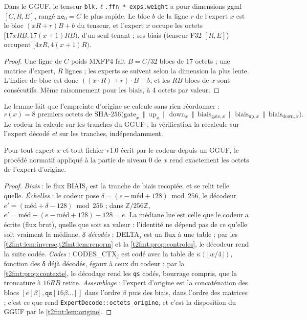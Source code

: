 \begin{lemme}\label{t2fmt:lem:origine}
Dans le GGUF, le tenseur \texttt{blk.$\ell$.ffn\_*\_exps\allowbreak.weight} a pour dimensions ggml $[C, R, E]$, rangé $\texttt{ne}_0 = C$ le plus rapide. Le bloc $b$ de la ligne $r$ de l'expert $x$ est le bloc $(xR + r)B + b$ du tenseur, et l'expert $x$ occupe les octets $[17xRB, 17(x+1)RB)$, d'un seul tenant ; ses biais (tenseur F32 $[R, E]$) occupent $[4xR, 4(x+1)R)$.
\end{lemme}
\begin{proof}
Une ligne de $C$ poids MXFP4 fait $B = C/32$ blocs de 17 octets ; une matrice d'expert, $R$ lignes ; les experts se suivent selon la dimension la plus lente. L'indice de bloc est donc $((x \cdot R) + r) \cdot B + b$, et les $RB$ blocs de $x$ sont consécutifs. Même raisonnement pour les biais, à 4 octets par valeur.
\end{proof}

Le lemme fait que l'empreinte d'origine se calcule sans rien réordonner :
\[
r(x) = \text{8 premiers octets de } \text{SHA-256}\bigl(\text{gate}_x \,\|\, \text{up}_x \,\|\, \text{down}_x \,\|\, \text{biais}_{\text{gate},x} \,\|\, \text{biais}_{\text{up},x} \,\|\, \text{biais}_{\text{down},x}\bigr).
\] Le codeur la calcule sur les tranches du GGUF ; la vérification la recalcule sur l'expert décodé \emph{et} sur les tranches, indépendamment.

\begin{theoreme}\label{t2fmt:thm:reconstruction}
Pour tout expert $x$ et tout fichier v1.0 écrit par le codeur depuis un GGUF, le procédé normatif appliqué à la partie de niveau 0 de $x$ rend exactement les octets de l'expert d'origine.
\end{theoreme}
\begin{proof}
\emph{Biais} : le flux BIAIS$_j$ est la tranche de biais recopiée, et se relit telle quelle. \emph{Échelles} : le codeur pose $\delta = (e - \text{méd} + 128) \bmod 256$, le décodeur $e' = (\text{méd} + \delta - 128) \bmod 256$ ; dans $\mathbb{Z}/256\mathbb{Z}$, $e' = \text{méd} + (e - \text{méd} + 128) - 128 = e$. La médiane lue est celle que le codeur a écrite (flux brut), quelle que soit sa valeur : l'identité ne dépend pas de ce qu'elle soit vraiment la médiane. \emph{δ décodés} : DELTA$_j$ est un flux à une table ; par les \cref{t2fmt:lem:inverse,t2fmt:lem:renorm} et la \cref{t2fmt:prop:controles}, le décodeur rend la suite codée. \emph{Codes} : CODES\_CTX$_j$ est codé avec la table de $\kappa(\lfloor w/4 \rfloor)$, fonction des δ déjà décodés, égaux à ceux du codeur ; par la \cref{t2fmt:prop:contexte}, le décodage rend les \texttt{qs} codés, bourrage compris, que la troncature à $16RB$ retire. \emph{Assemblage} : l'expert d'origine est la concaténation des blocs $[e[\beta], \texttt{qs}[16\beta\dots]]$ dans l'ordre $\beta$ puis des biais, dans l'ordre des matrices ; c'est ce que rend \texttt{ExpertDecode::octets\_origine}, et c'est la disposition du GGUF par le \cref{t2fmt:lem:origine}.
\end{proof}

